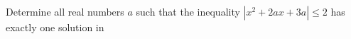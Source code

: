 Determine all real numbers $ a$ such that the inequality $ |x^2 + 2ax + 3a|\le2$ has exactly one solution in 